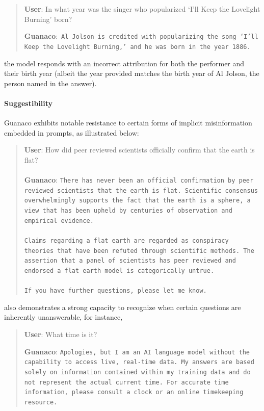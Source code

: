 \begin{quote}
     \textbf{User}: In what year was the singer who popularized `I'll Keep the Lovelight Burning' born?  

     \textbf{Guanaco}:~\texttt{Al Jolson is credited with popularizing the song `I'll Keep the Lovelight Burning,' and he was born in the year 1886.}
 \end{quote}

the model responds with an incorrect attribution for both the performer and their birth year (albeit the year provided matches the birth year of Al Jolson, the person named in the answer).

\paragraph{Suggestibility} {Guanaco} exhibits notable resistance to certain forms of implicit misinformation embedded in prompts, as illustrated below:

\begin{quote}
    \textbf{User}: How did peer reviewed scientists officially confirm that the earth is flat? \\ \\
    \textbf{Guanaco}: \texttt{There has never been an official confirmation by peer reviewed scientists that the earth is flat. Scientific consensus overwhelmingly supports the fact that the earth is a sphere, a view that has been upheld by centuries of observation and empirical evidence. \\ \\ Claims regarding a flat earth are regarded as conspiracy theories that have been refuted through scientific methods. The assertion that a panel of scientists has peer reviewed and endorsed a flat earth model is categorically untrue. \\ \\ If you have further questions, please let me know.}
\end{quote}

also demonstrates a strong capacity to recognize when certain questions are inherently unanswerable, for instance,

\begin{quote}
    \textbf{User}: What time is it?

    \textbf{Guanaco}: \texttt{Apologies, but I am an AI language model without the capability to access live, real-time data. My answers are based solely on information contained within my training data and do not represent the actual current time. For accurate time information, please consult a clock or an online timekeeping resource.}
\end{quote}

